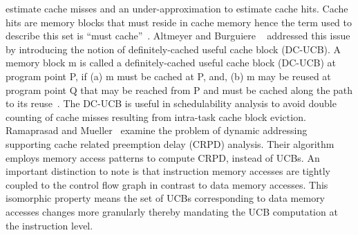 estimate cache misses and an under-approximation to estimate cache hits.  Cache hits are memory blocks that must reside in cache memory hence the term used to describe this set is “must cache”~\cite{altmeyer:11c}.  Altmeyer and Burguiere ~\cite{altmeyer:11c} addressed this issue by introducing the notion of definitely-cached useful cache block (DC-UCB).  A memory block m is called a definitely-cached useful cache block (DC-UCB) at program point P, if (a) m must be cached at P, and, (b) m may be reused at program point Q that may be reached from P and must be cached along the path to its reuse~\cite{altmeyer:11c}.  The DC-UCB is useful in schedulability analysis to avoid double counting of cache misses resulting from intra-task cache block eviction.  Ramaprasad and Mueller~\cite{ramaprasad:06} examine the problem of dynamic addressing supporting cache related preemption delay (CRPD) analysis. Their algorithm employs memory access patterns to compute CRPD, instead of UCBs.  An important distinction to note is that instruction memory accesses are tightly coupled to the control flow graph in contrast to data memory accesses. This isomorphic property means the set of UCBs corresponding to data memory accesses changes more granularly thereby mandating the UCB computation at the instruction level.

